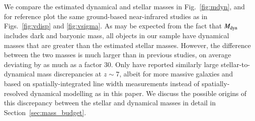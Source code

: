 \documentclass[longauth]{aa}
\newcommand{\Mdyn}{M_{\rm dyn}}
\begin{document}
We compare the estimated dynamical and stellar masses in Fig.~\ref{fig:mdyn}, and for reference plot the same ground-based near-infrared studies as in Figs.~\ref{fig:vdisp} and \ref{fig:vsigma}. As may be expected from the fact that $\Mdyn$ includes dark and baryonic mass, all objects in our sample have dynamical masses that are greater than the estimated stellar masses. However, the difference between the two masses is much larger than in previous studies, on average deviating by as much as a factor 30. {Only \citet{Topping2022} have reported similarly large stellar-to-dynamical mass discrepancies at $z\sim7$, albeit for more massive galaxies and based on spatially-integrated line width measurements instead of spatially-resolved dynamical modelling as in this paper. We discuss the possible origins of this discrepancy between the stellar and dynamical masses in detail in Section~\ref{sec:mass_budget}. }
\end{document}
